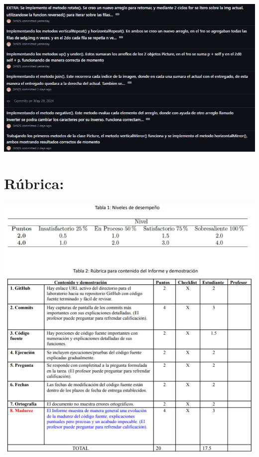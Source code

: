 \documentclass{article}
\begin{document}
\includegraphics[width=\textwidth]{img/commits2.png}
\section{Rúbrica:}




\includegraphics[width=\textwidth]{img/rubrica.png}
\end{document}
